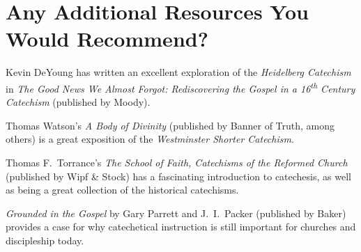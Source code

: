 \section*{Any Additional Resources You Would Recommend?}

Kevin DeYoung %
%
has written an excellent exploration of the \emph{Heidelberg Catechism\/}%
%
in \emph{The Good News We Almost Forgot: Rediscovering the Gospel in a 16\textsuperscript{th} Century Catechism\/}%
(published by Moody).\nocite{DeYoung:2010}

Thomas Watson's \emph{A Body of Divinity\/} (published by Banner of Truth, among others) is a great exposition of the \emph{Westminster Shorter Catechism}. %
\nocite{Watson:1957}

Thomas F.\ Torrance's %
\emph{The School of Faith, Catechisms of the Reformed Church} (published by Wipf \& Stock) has a fascinating introduction to catechesis, as well as being a great collection of the historical catechisms.\nocite{Torrance:1996}

\emph{Grounded in the Gospel\/} by Gary Parrett %
and J.~I.\ Packer %
(published by Baker) provides a case for why catechetical instruction is still important for churches and discipleship today.\nocite{Gary-Parrett:2010}

\cleardoublepage


